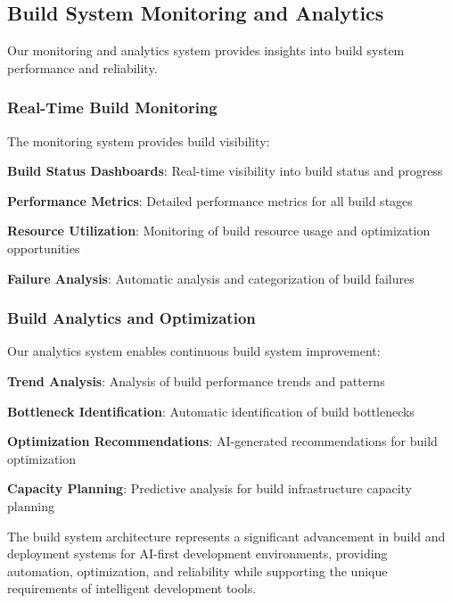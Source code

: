 \subsection*{Build System Monitoring and Analytics}

Our monitoring and analytics system provides insights into build system performance and reliability.

\subsubsection*{Real-Time Build Monitoring}

The monitoring system provides build visibility:

\begin{compactlist}
    \item \textbf{Build Status Dashboards}: Real-time visibility into build status and progress
    \item \textbf{Performance Metrics}: Detailed performance metrics for all build stages
    \item \textbf{Resource Utilization}: Monitoring of build resource usage and optimization opportunities
    \item \textbf{Failure Analysis}: Automatic analysis and categorization of build failures
\end{compactlist}

\subsubsection*{Build Analytics and Optimization}

Our analytics system enables continuous build system improvement:

\begin{compactlist}
    \item \textbf{Trend Analysis}: Analysis of build performance trends and patterns
    \item \textbf{Bottleneck Identification}: Automatic identification of build bottlenecks
    \item \textbf{Optimization Recommendations}: AI-generated recommendations for build optimization
    \item \textbf{Capacity Planning}: Predictive analysis for build infrastructure capacity planning
\end{compactlist}

The build system architecture represents a significant advancement in build and deployment systems for AI-first development environments, providing automation, optimization, and reliability while supporting the unique requirements of intelligent development tools.
